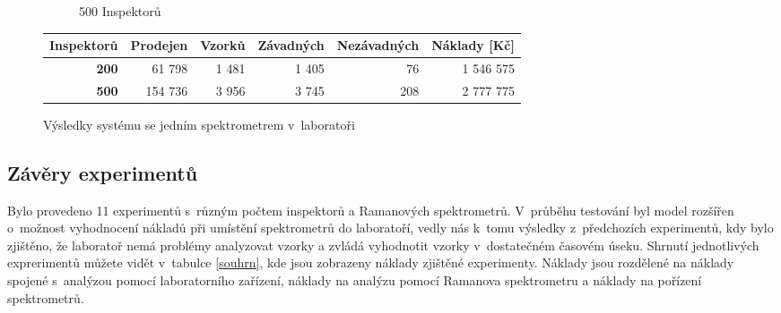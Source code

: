 \documentclass[11pt,a4paper]{article}
\begin{document}
\begin{figure}[h!]
\begin{subfigure}[t]{0.5\textwidth}
    \caption{500 Inspektorů}
    \label{specb}
  \end{subfigure}
 \begin{tabular}{|r|r|r|r|r|r|}  \hline
        \textbf{Inspektorů}&\textbf{Prodejen} & \textbf{Vzorků} & \textbf{Závadných}   
        & \textbf{Nezávadných} & \textbf{Náklady [Kč]} \\\hline
        \textbf{200}&61 798&1 481&1 405&76&1 546 575         \\\hline
        \textbf{500}&154 736&3 956&3 745&208&2 777 775         \\\hline
      \end{tabular}
      \caption{Výsledky systému se jedním spektrometrem v~laboratoři}
\end{figure} 
  
\subsection{Závěry experimentů}
Bylo provedeno 11 experimentů s~různým počtem inspektorů a Ramanových spektrometrů.
V~průběhu testování byl model rozšířen o~možnost vyhodnocení nákladů při umístění
spektrometrů do laboratoří, vedly nás k~tomu výsledky z~předchozích experimentů, kdy bylo
zjištěno, že laboratoř nemá problémy analyzovat vzorky a zvládá vyhodnotit vzorky 
v~dostatečném časovém úseku. 
Shrnutí jednotlivých exprerimentů můžete vidět v~tabulce \ref{souhrn}, kde jsou zobrazeny
náklady zjištěné experimenty. Náklady jsou rozdělené na náklady spojené s~analýzou
pomocí laboratorního zařízení, náklady na analýzu pomocí Ramanova spektrometru a náklady
na pořízení spektrometrů. 
\end{document}
